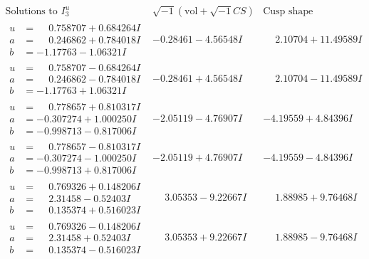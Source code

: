 \documentclass[1p]{elsarticle_modified}
\theoremstyle{definition}
\newcommand{\I}{\sqrt{-1}}
\begin{document}
$$\begin{array}{c|c|c}  
\text{Solutions to }I^u_{3}& \I (\text{vol} + \sqrt{-1}CS) & \text{Cusp shape}\\
 \hline 
\begin{aligned}
u &= \phantom{-}0.758707 + 0.684264 I \\
a &= \phantom{-}0.246862 + 0.784018 I \\
b &= -1.17763 - 1.06321 I\end{aligned}
 & -0.28461 - 4.56548 I & \phantom{-}2.10704 + 11.49589 I \\ \hline\begin{aligned}
u &= \phantom{-}0.758707 - 0.684264 I \\
a &= \phantom{-}0.246862 - 0.784018 I \\
b &= -1.17763 + 1.06321 I\end{aligned}
 & -0.28461 + 4.56548 I & \phantom{-}2.10704 - 11.49589 I \\ \hline\begin{aligned}
u &= \phantom{-}0.778657 + 0.810317 I \\
a &= -0.307274 + 1.000250 I \\
b &= -0.998713 - 0.817006 I\end{aligned}
 & -2.05119 - 4.76907 I & -4.19559 + 4.84396 I \\ \hline\begin{aligned}
u &= \phantom{-}0.778657 - 0.810317 I \\
a &= -0.307274 - 1.000250 I \\
b &= -0.998713 + 0.817006 I\end{aligned}
 & -2.05119 + 4.76907 I & -4.19559 - 4.84396 I \\ \hline\begin{aligned}
u &= \phantom{-}0.769326 + 0.148206 I \\
a &= \phantom{-}2.31458 - 0.52403 I \\
b &= \phantom{-}0.135374 + 0.516023 I\end{aligned}
 & \phantom{-}3.05353 - 9.22667 I & \phantom{-}1.88985 + 9.76468 I \\ \hline\begin{aligned}
u &= \phantom{-}0.769326 - 0.148206 I \\
a &= \phantom{-}2.31458 + 0.52403 I \\
b &= \phantom{-}0.135374 - 0.516023 I\end{aligned}
 & \phantom{-}3.05353 + 9.22667 I & \phantom{-}1.88985 - 9.76468 I \\ \hline\begin{aligned}

\end{aligned}
\end{array}$$
\end{document}
